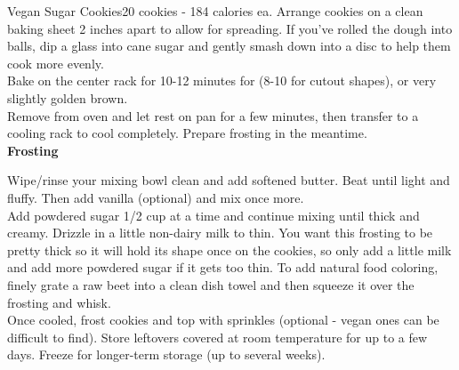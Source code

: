\begin{recipe}{Vegan Sugar Cookies}{20 cookies - 184 calories ea.}{}
Arrange cookies on a clean baking sheet 2 inches apart to allow for spreading. If you’ve rolled the dough into balls, dip a glass into cane sugar and gently smash down into a disc to help them cook more evenly.\\

Bake on the center rack for 10-12 minutes for (8-10 for cutout shapes), or very slightly golden brown.\\

Remove from oven and let rest on pan for a few minutes, then transfer to a cooling rack to cool completely. Prepare frosting in the meantime.\\

\textbf{Frosting}

Wipe/rinse your mixing bowl clean and add softened butter. Beat until light and fluffy. Then add vanilla (optional) and mix once more.\\ 

Add powdered sugar 1/2 cup at a time and continue mixing until thick and creamy. Drizzle in a little non-dairy milk to thin. You want this frosting to be pretty thick so it will hold its shape once on the cookies, so only add a little milk and add more powdered sugar if it gets too thin.
To add natural food coloring, finely grate a raw beet into a clean dish towel and then squeeze it over the frosting and whisk.\\

Once cooled, frost cookies and top with sprinkles (optional - vegan ones can be difficult to find). Store leftovers covered at room temperature for up to a few days. Freeze for longer-term storage (up to several weeks).

\end{recipe}